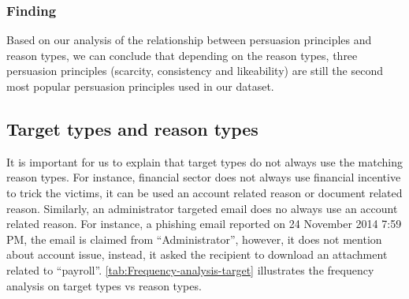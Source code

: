 \subsubsection{\label{sub:Finding-1}Finding}

Based on our analysis of the relationship between persuasion principles
and reason types, we can conclude that depending on the reason types,
three persuasion principles (scarcity, consistency and likeability)
are still the second most popular persuasion principles used in our
dataset.


\subsection{Target types and reason types}

It is important for us to explain that target types do not always
use the matching reason types. For instance, financial sector does
not always use financial incentive to trick the victims, it can be
used an account related reason or document related reason. Similarly,
an administrator targeted email does no always use an account related
reason. For instance, a phishing email reported on 24 November 2014
7:59 PM, the email is claimed from ``Administrator'', however, it
does not mention about account issue, instead, it asked the recipient
to download an attachment related to ``payroll''. \autoref{tab:Frequency-analysis-target}
illustrates the frequency analysis on target types vs reason types. 

